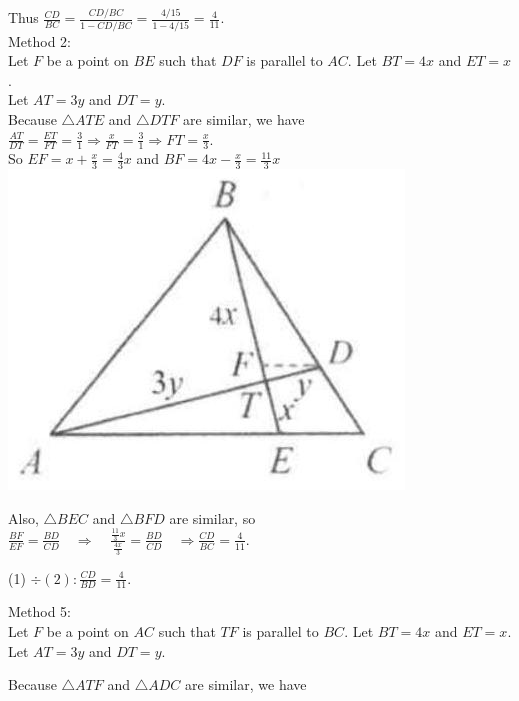 \documentclass{article}
\begin{document}
Thus \(\frac{C D}{B C}=\frac{C D / B C}{1-C D / B C}=\frac{4 / 15}{1-4 / 15}=\frac{4}{11}\).\\
Method 2:\\
Let \(F\) be a point on \(B E\) such that \(D F\) is parallel to \(A C\). Let \(B T=4 x\) and \(E T=x\).\\
Let \(A T=3 y\) and \(D T=y\).\\
Because \(\triangle A T E\) and \(\triangle D T F\) are similar, we have\\
\(\frac{A T}{D T}=\frac{E T}{F T}=\frac{3}{1} \Rightarrow \frac{x}{F T}=\frac{3}{1} \Rightarrow F T=\frac{x}{3}\).\\
So \(E F=x+\frac{x}{3}=\frac{4}{3} x\) and \(B F=4 x-\frac{x}{3}=\frac{11}{3} x\)\\
\centering
\includegraphics[width=\textwidth]{images/104(2).jpg}

Also, \(\triangle B E C\) and \(\triangle B F D\) are similar, so\\
\(\frac{B F}{E F}=\frac{B D}{C D} \quad \Rightarrow \quad \frac{\frac{11}{3} x}{\frac{4 x}{3}}=\frac{B D}{C D} \quad \Rightarrow \frac{C D}{B C}=\frac{4}{11}\).


(1) \(\div(2): \frac{C D}{B D}=\frac{4}{11}\).

Method 5:\\
Let \(F\) be a point on \(A C\) such that \(T F\) is parallel to \(B C\). Let \(B T=4 x\) and \(E T=x\). Let \(A T=3 y\) and \(D T=y\).

Because \(\triangle A T F\) and \(\triangle A D C\) are similar, we have
\end{document}
